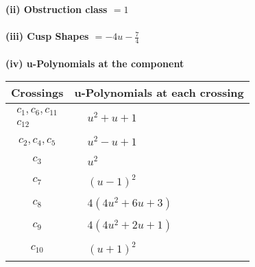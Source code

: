 \documentclass[1p]{elsarticle_modified}
\theoremstyle{definition}
\begin{document}
\flushleft \textbf{(ii) Obstruction class $= 1$}\\~\\
\flushleft \textbf{(iii) Cusp Shapes $= -4 u-\frac{7}{4}$}\\~\\
\newpage\renewcommand{\arraystretch}{1}
\flushleft \textbf{(iv) u-Polynomials at the component}\newline \\
\begin{tabular}{m{50pt}|m{274pt}}
Crossings & \hspace{64pt}u-Polynomials at each crossing \\
\hline $$\begin{aligned}c_{1},c_{6},c_{11}\\c_{12}\end{aligned}$$&$\begin{aligned}
&u^2+u+1
\end{aligned}$\\
\hline $$\begin{aligned}c_{2},c_{4},c_{5}\end{aligned}$$&$\begin{aligned}
&u^2- u+1
\end{aligned}$\\
\hline $$\begin{aligned}c_{3}\end{aligned}$$&$\begin{aligned}
&u^2
\end{aligned}$\\
\hline $$\begin{aligned}c_{7}\end{aligned}$$&$\begin{aligned}
&(u-1)^2
\end{aligned}$\\
\hline $$\begin{aligned}c_{8}\end{aligned}$$&$\begin{aligned}
&4(4 u^2+6 u+3)
\end{aligned}$\\
\hline $$\begin{aligned}c_{9}\end{aligned}$$&$\begin{aligned}
&4(4 u^2+2 u+1)
\end{aligned}$\\
\hline $$\begin{aligned}c_{10}\end{aligned}$$&$\begin{aligned}
&(u+1)^2
\end{aligned}$\\
\hline
\end{tabular}\\~\\
\end{document}
